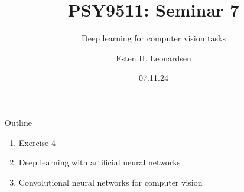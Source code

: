 \documentclass[10pt]{beamer}
\title{PSY9511: Seminar 7}
\subtitle{Deep learning for computer vision tasks}
\author{Esten H. Leonardsen}
\date{07.11.24}
\begin{document}
	\begin{frame}
	 	\maketitle
	\end{frame}

    \begin{frame}{Outline}
        \begin{enumerate}
            \item Exercise 4
            \item Deep learning with artificial neural networks
            \item Convolutional neural networks for computer vision
        \end{enumerate}
    \end{frame}

    \def\nodesize{14pt}


    \newcommand{\highlightedneuron}[4]{
        \node[
            circle,
            draw=#4,
            fill=nodefill,
            minimum size=\nodesize,
            inner sep=0pt
        ] (#2) at #1 {};
    }

    \newcommand{\artificialneuron}[3]{
        \highlightedneuron{#1}{#2}{#3}{black}
    }

    \def\spacing{-0.1cm}

    
    
    
\end{document}
